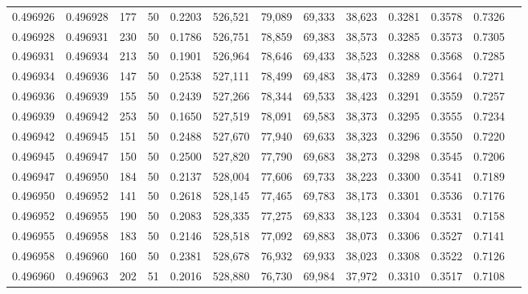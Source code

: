 \begin{tabular}{rrrrrrrrrrrrr}
0.496926 & 0.496928 &   177 &  50 &                                     0.2203 & 526,521 &  79,089 &  69,333 &  38,623 & 0.3281 & 0.3578 & 0.7326 \\
0.496928 & 0.496931 &   230 &  50 &                                     0.1786 & 526,751 &  78,859 &  69,383 &  38,573 & 0.3285 & 0.3573 & 0.7305 \\
0.496931 & 0.496934 &   213 &  50 &                                     0.1901 & 526,964 &  78,646 &  69,433 &  38,523 & 0.3288 & 0.3568 & 0.7285 \\
0.496934 & 0.496936 &   147 &  50 &                                     0.2538 & 527,111 &  78,499 &  69,483 &  38,473 & 0.3289 & 0.3564 & 0.7271 \\
0.496936 & 0.496939 &   155 &  50 &                                     0.2439 & 527,266 &  78,344 &  69,533 &  38,423 & 0.3291 & 0.3559 & 0.7257 \\
0.496939 & 0.496942 &   253 &  50 &                                     0.1650 & 527,519 &  78,091 &  69,583 &  38,373 & 0.3295 & 0.3555 & 0.7234 \\
0.496942 & 0.496945 &   151 &  50 &                                     0.2488 & 527,670 &  77,940 &  69,633 &  38,323 & 0.3296 & 0.3550 & 0.7220 \\
0.496945 & 0.496947 &   150 &  50 &                                     0.2500 & 527,820 &  77,790 &  69,683 &  38,273 & 0.3298 & 0.3545 & 0.7206 \\
0.496947 & 0.496950 &   184 &  50 &                                     0.2137 & 528,004 &  77,606 &  69,733 &  38,223 & 0.3300 & 0.3541 & 0.7189 \\
0.496950 & 0.496952 &   141 &  50 &                                     0.2618 & 528,145 &  77,465 &  69,783 &  38,173 & 0.3301 & 0.3536 & 0.7176 \\
0.496952 & 0.496955 &   190 &  50 &                                     0.2083 & 528,335 &  77,275 &  69,833 &  38,123 & 0.3304 & 0.3531 & 0.7158 \\
0.496955 & 0.496958 &   183 &  50 &                                     0.2146 & 528,518 &  77,092 &  69,883 &  38,073 & 0.3306 & 0.3527 & 0.7141 \\
0.496958 & 0.496960 &   160 &  50 &                                     0.2381 & 528,678 &  76,932 &  69,933 &  38,023 & 0.3308 & 0.3522 & 0.7126 \\
0.496960 & 0.496963 &   202 &  51 &                                     0.2016 & 528,880 &  76,730 &  69,984 &  37,972 & 0.3310 & 0.3517 & 0.7108 \\

\end{tabular}
